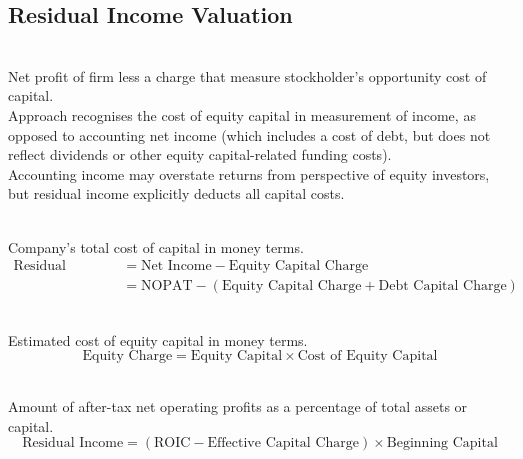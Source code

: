 \subsection{Residual Income Valuation}

\begin{definition} \\
Net profit of firm less a charge that measure stockholder's opportunity cost of capital.\\
Approach recognises the cost of equity capital in measurement of income, as opposed to accounting net income (which includes a cost of debt, but does not reflect dividends or other equity capital-related funding costs).\\
Accounting income may overstate returns from perspective of equity investors, but residual income explicitly deducts all capital costs.
\end{definition}

\begin{definition} \\
Company's total cost of capital in money terms.
\begin{align}
\text{Residual Income} &= \text{Net Income} - \text{Equity Capital Charge} \nonumber \\
&= \text{NOPAT} - (\text{Equity Capital Charge} + \text{Debt Capital Charge}) \nonumber
\end{align}
\end{definition}

\begin{definition} \\
Estimated cost of equity capital in money terms.
\begin{equation}
\text{Equity Charge} = \text{Equity Capital} \times \text{Cost of Equity Capital} \nonumber
\end{equation}
\end{definition}

\begin{definition} \\
Amount of after-tax net operating profits as a percentage of total assets or capital.
\begin{equation}
\text{Residual Income} = (\text{ROIC} - \text{Effective Capital Charge}) \times \text{Beginning Capital} \nonumber
\end{equation}
\end{definition}

